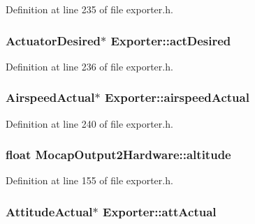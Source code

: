 \-Definition at line 235 of file exporter.\-h.

\hypertarget{group___mo_cap_plugin_ga480be6f8874e252461095878c7b41d08}{
\subsubsection[{act\-Desired}]{\setlength{\rightskip}{0pt plus 5cm}\-Actuator\-Desired$\ast$ {\bf \-Exporter\-::act\-Desired}}}\label{group___mo_cap_plugin_ga480be6f8874e252461095878c7b41d08}


\-Definition at line 236 of file exporter.\-h.

\hypertarget{group___mo_cap_plugin_ga933ba2309643df8ddd342ae4cf010fca}{
\subsubsection[{airspeed\-Actual}]{\setlength{\rightskip}{0pt plus 5cm}\-Airspeed\-Actual$\ast$ {\bf \-Exporter\-::airspeed\-Actual}}}\label{group___mo_cap_plugin_ga933ba2309643df8ddd342ae4cf010fca}


\-Definition at line 240 of file exporter.\-h.

\hypertarget{group___mo_cap_plugin_ga6f5725506a151cfd49e1c6b80c2e948f}{
\subsubsection[{altitude}]{\setlength{\rightskip}{0pt plus 5cm}float {\bf \-Mocap\-Output2\-Hardware\-::altitude}}}\label{group___mo_cap_plugin_ga6f5725506a151cfd49e1c6b80c2e948f}


\-Definition at line 155 of file exporter.\-h.

\hypertarget{group___mo_cap_plugin_gaa96960187d095cbbc69ba0cc08d776a7}{
\subsubsection[{att\-Actual}]{\setlength{\rightskip}{0pt plus 5cm}\-Attitude\-Actual$\ast$ {\bf \-Exporter\-::att\-Actual}}}\label{group___mo_cap_plugin_gaa96960187d095cbbc69ba0cc08d776a7}


